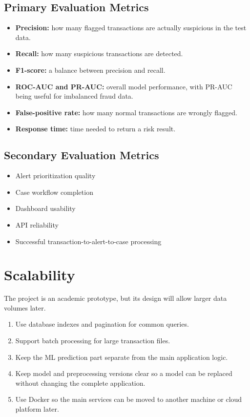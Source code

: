\documentclass[11pt,a4paper]{article}
\begin{document}
\subsection{Primary Evaluation Metrics}
\begin{itemize}[leftmargin=0.7cm]
    \item \textbf {Precision:} how many flagged transactions are actually suspicious in the test data.
    \item \textbf {Recall:} how many suspicious transactions are detected.
    \item \textbf {F1-score:} a balance between precision and recall.
    \item \textbf {ROC-AUC and PR-AUC:} overall model performance, with PR-AUC being useful for imbalanced fraud data.
    \item \textbf {False-positive rate:} how many normal transactions are wrongly flagged.
    \item \textbf {Response time:} time needed to return a risk result.
\end{itemize}

\subsection{Secondary Evaluation Metrics}
\begin{itemize}[leftmargin=0.7cm]
    \item Alert prioritization quality
    \item Case workflow completion
    \item Dashboard usability
    \item API reliability
    \item Successful transaction-to-alert-to-case processing
\end{itemize}

\section{Scalability }
The project is an academic prototype, but its design will allow larger data volumes later.
\begin{enumerate}[leftmargin=0.7cm]
    \item Use database indexes and pagination for common queries.
    \item Support batch processing for large transaction files.
    \item Keep the ML prediction part separate from the main application logic.
    \item Keep model and preprocessing versions clear so a model can be replaced without changing the complete application.
    \item Use Docker so the main services can be moved to another machine or cloud platform later.
\end{enumerate}
\end{document}
